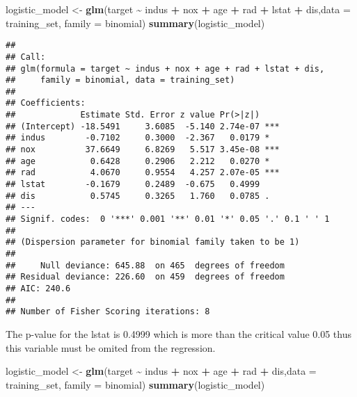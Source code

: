 \documentclass[
]{article}
\newenvironment{Shaded}{\begin{snugshade}}{\end{snugshade}}
\newcommand{\AttributeTok}[1]{\textcolor[rgb]{0.13,0.29,0.53}{#1}}
\newcommand{\FunctionTok}[1]{\textcolor[rgb]{0.13,0.29,0.53}{\textbf{#1}}}
\newcommand{\NormalTok}[1]{#1}
\newcommand{\OtherTok}[1]{\textcolor[rgb]{0.56,0.35,0.01}{#1}}
\newcommand{\SpecialCharTok}[1]{\textcolor[rgb]{0.81,0.36,0.00}{\textbf{#1}}}
\begin{document}
\begin{Shaded}
\begin{Highlighting}[]
\NormalTok{logistic\_model }\OtherTok{\textless{}{-}}  \FunctionTok{glm}\NormalTok{(target }\SpecialCharTok{\textasciitilde{}}\NormalTok{ indus }\SpecialCharTok{+}\NormalTok{ nox }\SpecialCharTok{+}\NormalTok{ age }\SpecialCharTok{+}\NormalTok{ rad }\SpecialCharTok{+}\NormalTok{ lstat }\SpecialCharTok{+}\NormalTok{ dis,}\AttributeTok{data =}\NormalTok{ training\_set, }\AttributeTok{family =}\NormalTok{ binomial)}
\FunctionTok{summary}\NormalTok{(logistic\_model)}
\end{Highlighting}
\end{Shaded}

\begin{verbatim}
## 
## Call:
## glm(formula = target ~ indus + nox + age + rad + lstat + dis, 
##     family = binomial, data = training_set)
## 
## Coefficients:
##             Estimate Std. Error z value Pr(>|z|)    
## (Intercept) -18.5491     3.6085  -5.140 2.74e-07 ***
## indus        -0.7102     0.3000  -2.367   0.0179 *  
## nox          37.6649     6.8269   5.517 3.45e-08 ***
## age           0.6428     0.2906   2.212   0.0270 *  
## rad           4.0670     0.9554   4.257 2.07e-05 ***
## lstat        -0.1679     0.2489  -0.675   0.4999    
## dis           0.5745     0.3265   1.760   0.0785 .  
## ---
## Signif. codes:  0 '***' 0.001 '**' 0.01 '*' 0.05 '.' 0.1 ' ' 1
## 
## (Dispersion parameter for binomial family taken to be 1)
## 
##     Null deviance: 645.88  on 465  degrees of freedom
## Residual deviance: 226.60  on 459  degrees of freedom
## AIC: 240.6
## 
## Number of Fisher Scoring iterations: 8
\end{verbatim}

The p-value for the lstat is 0.4999 which is more than the critical
value 0.05 thus this variable must be omited from the regression.

\begin{Shaded}
\begin{Highlighting}[]
\NormalTok{logistic\_model }\OtherTok{\textless{}{-}}  \FunctionTok{glm}\NormalTok{(target }\SpecialCharTok{\textasciitilde{}}\NormalTok{ indus }\SpecialCharTok{+}\NormalTok{ nox }\SpecialCharTok{+}\NormalTok{ age }\SpecialCharTok{+}\NormalTok{ rad }\SpecialCharTok{+}\NormalTok{ dis,}\AttributeTok{data =}\NormalTok{ training\_set, }\AttributeTok{family =}\NormalTok{ binomial)}
\FunctionTok{summary}\NormalTok{(logistic\_model)}
\end{Highlighting}
\end{Shaded}
\end{document}
